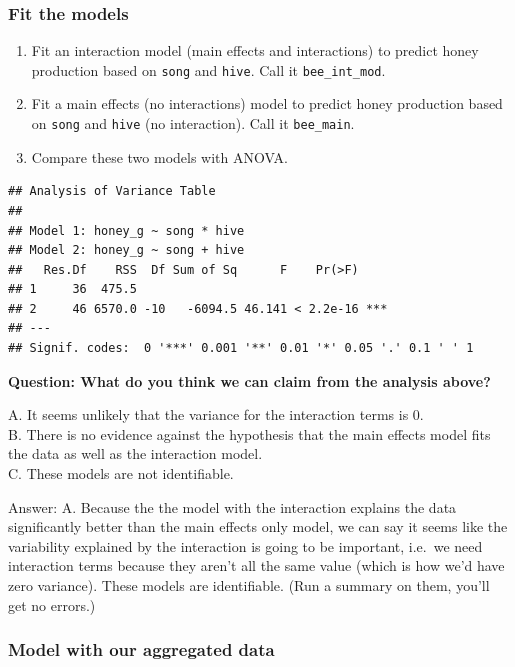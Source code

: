 \documentclass[
  openany]{book}
\providecommand{\tightlist}{%
  \setlength{\itemsep}{0pt}\setlength{\parskip}{0pt}}
\begin{document}
\hypertarget{fit-the-models}{%
\subsubsection{Fit the models}\label{fit-the-models}}

\begin{enumerate}
\def\labelenumi{\arabic{enumi}.}
\tightlist
\item
  Fit an interaction model (main effects and interactions) to predict honey production based on \texttt{song} and \texttt{hive}. Call it \texttt{bee\_int\_mod}.\\
\item
  Fit a main effects (no interactions) model to predict honey production based on \texttt{song} and \texttt{hive} (no interaction). Call it \texttt{bee\_main}.\\
\item
  Compare these two models with ANOVA.
\end{enumerate}

\begin{verbatim}
## Analysis of Variance Table
## 
## Model 1: honey_g ~ song * hive
## Model 2: honey_g ~ song + hive
##   Res.Df    RSS  Df Sum of Sq      F    Pr(>F)    
## 1     36  475.5                                   
## 2     46 6570.0 -10   -6094.5 46.141 < 2.2e-16 ***
## ---
## Signif. codes:  0 '***' 0.001 '**' 0.01 '*' 0.05 '.' 0.1 ' ' 1
\end{verbatim}

\textbf{Question: What do you think we can claim from the analysis above?}

A. It seems unlikely that the variance for the interaction terms is 0.\\
B. There is no evidence against the hypothesis that the main effects model fits the data as well as the interaction model.\\
C. These models are not identifiable.

Answer: A. Because the the model with the interaction explains the data significantly better than the main effects only model, we can say it seems like the variability explained by the interaction is going to be important, i.e.~we need interaction terms because they aren't all the same value (which is how we'd have zero variance). These models are identifiable. (Run a summary on them, you'll get no errors.)

\hypertarget{model-with-our-aggregated-data}{%
\subsubsection{Model with our aggregated data}\label{model-with-our-aggregated-data}}
\end{document}
